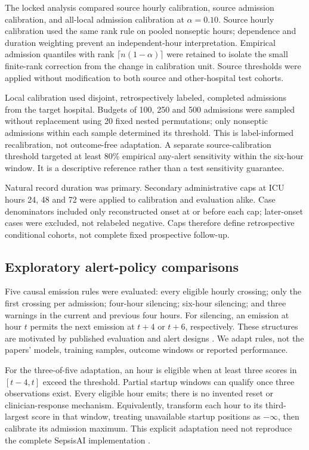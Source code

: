 \documentclass[11pt,a4paper]{article}
\begin{document}
The locked analysis compared source hourly calibration, source admission calibration, and all-local admission calibration at $\alpha=0.10$. Source hourly calibration used the same rank rule on pooled nonseptic hours; dependence and duration weighting prevent an independent-hour interpretation. Empirical admission quantiles with rank $\lceil n(1-\alpha)\rceil$ were retained to isolate the small finite-rank correction from the change in calibration unit. Source thresholds were applied without modification to both source and other-hospital test cohorts.

Local calibration used disjoint, retrospectively labeled, completed admissions from the target hospital. Budgets of 100, 250 and 500 admissions were sampled without replacement using 20 fixed nested permutations; only nonseptic admissions within each sample determined its threshold. This is label-informed recalibration, not outcome-free adaptation. A separate source-calibration threshold targeted at least 80\% empirical any-alert sensitivity within the six-hour window. It is a descriptive reference rather than a test sensitivity guarantee.

Natural record duration was primary. Secondary administrative caps at ICU hours 24, 48 and 72 were applied to calibration and evaluation alike. Case denominators included only reconstructed onset at or before each cap; later-onset cases were excluded, not relabeled negative. Caps therefore define retrospective conditional cohorts, not complete fixed prospective follow-up.

\subsection{Exploratory alert-policy comparisons}
Five causal emission rules were evaluated: every eligible hourly crossing; only the first crossing per admission; four-hour silencing; six-hour silencing; and three warnings in the current and previous four hours. For silencing, an emission at hour $t$ permits the next emission at $t+4$ or $t+6$, respectively. These structures are motivated by published evaluation and alert designs \cite{do,moor,composer,gupta}. We adapt rules, not the papers' models, training samples, outcome windows or reported performance.

For the three-of-five adaptation, an hour is eligible when at least three scores in $[t-4,t]$ exceed the threshold. Partial startup windows can qualify once three observations exist. Every eligible hour emits; there is no invented reset or clinician-response mechanism. Equivalently, transform each hour to its third-largest score in that window, treating unavailable startup positions as $-\infty$, then calibrate its admission maximum. This explicit adaptation need not reproduce the complete SepsisAI implementation \cite{gupta}.
\end{document}
